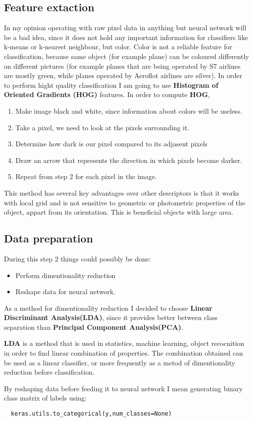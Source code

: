 \documentclass[a4paper,12pt]{article}
\begin{document}
\subsection{Feature extaction}
In my opinion operating with raw pixel data in anything but neural network will be a bad idea, since 
it does not hold any important information for classifiers like k-means or k-nearest neighbour, but color.
Color is not a reliable feature for classification, because same object (for example plane) can be coloured differently
on different pictures (for example planes that are being operated by S7 airlines are mostly green, while planes operated
by Aeroflot airlines are silver). 
In order to perform hight quality classification I am going to use \textbf{Histogram of Oriented Gradients (HOG)} features. 
In order to compute \textbf{HOG},
\begin{enumerate}
  \item Make image black and white, since information about colors will be useless.
  \item Take a pixel, we need to look at the pixels surrounding it.
  \item Determine how dark is our pixel compared to its adjasent pixels
  \item Draw an arrow that represents the direction in which pixels become darker.
  \item Repeat from step 2 for each pixel in the image.
\end{enumerate}
This method has several key advantages over other descriptors is that it works with local grid and
is not sensitive to geometric or photometric properties of the object, appart from its orientation. 
This is beneficial objects with large area.

\subsection{Data preparation}
During this step 2 things could possibly be done:
\begin{itemize}
  \item Perform dimentionality reduction
  \item Reshape data for neural network.
\end{itemize}
As a method for dimentionality reduction I decided to choose 
\textbf{Linear Discriminant Analysis(LDA)},
since it provides better between class separation than 
\textbf{Principal Component Analysis(PCA)}. 

\textbf{LDA} is a method that is used in statistics, machine learning,
object recocnition in order to find linear combination of properties.
The combination obtained can be used as a linear classifier, or more frequently
as a metod of dimentionality reduction before classification.

By reshaping data before feeding it to neural network I mean generating binary class
matrix of labels using:
\begin{lstlisting}
  keras.utils.to_categorical(y,num_classes=None)
\end{lstlisting}
\end{document}
